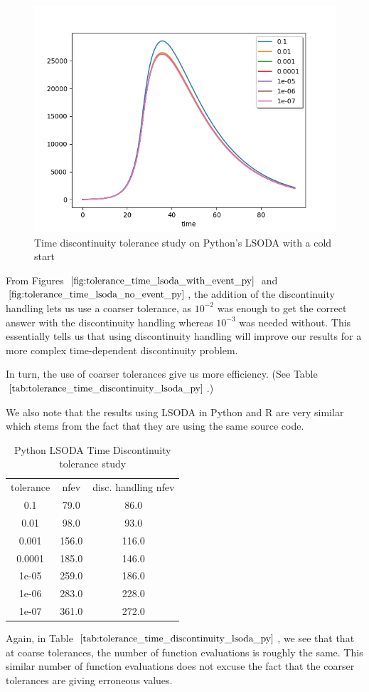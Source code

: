 \begin{figure}[h]
	\centering
	\includegraphics[width=0.7\linewidth]{./figures/tolerance_time_lsoda_with_event_py}
	\caption{Time discontinuity tolerance study on Python's LSODA with a cold start}
	\label{fig:tolerance_time_lsoda_with_event_py}
\end{figure}

From Figures $\ref{fig:tolerance_time_lsoda_with_event_py}$ and $\ref{fig:tolerance_time_lsoda_no_event_py}$, the addition of the discontinuity handling lets us use a coarser tolerance, as $10^{-2}$ was enough to get the correct answer with the discontinuity handling whereas $10^{-3}$ was needed without. This essentially tells us that using discontinuity handling will improve our results for a more complex time-dependent discontinuity problem.

In turn, the use of coarser tolerances give us more efficiency. (See Table $\ref{tab:tolerance_time_discontinuity_lsoda_py}$.)

We also note that the results using LSODA in Python and R are very similar which stems from the fact that they are using the same source code.

\begin{table}[h]
\caption {Python LSODA Time Discontinuity tolerance study} \label{tab:tolerance_time_discontinuity_lsoda_py} 
\begin{center}
\begin{tabular}{ c c c }
tolerance & nfev  & disc. handling nfev \\ 
0.1    & 79.0  & 86.0  \\
0.01   & 98.0  & 93.0  \\
0.001  & 156.0 & 116.0 \\
0.0001 & 185.0 & 146.0 \\
1e-05  & 259.0 & 186.0 \\
1e-06  & 283.0 & 228.0 \\
1e-07  & 361.0 & 272.0 \\
\end{tabular}
\end{center}
\end{table}
Again, in Table $\ref{tab:tolerance_time_discontinuity_lsoda_py}$, we see that that at coarse tolerances, the number of function evaluations is roughly the same. This similar number of function evaluations does not excuse the fact that the coarser tolerances are giving erroneous values. 

